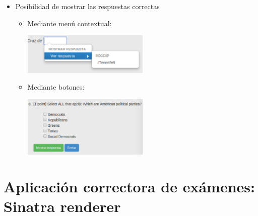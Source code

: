 \documentclass{beamer}
\begin{document}
\begin{frame}[allowframebreaks]
\begin{itemize}
    \item Posibilidad de mostrar las respuestas correctas
    \bigskip
    \begin{itemize}
      \item Mediante menú contextual:
      \newline
      \begin{center}
        \includegraphics[width=0.5\textwidth]{img/show_answer.eps}
      \end{center}
      \item Mediante botones:
      \newline
      \begin{center}
        \includegraphics[width=0.5\textwidth]{img/sm.eps}
      \end{center}  
    \end{itemize}
    
  \end{itemize}
\end{frame}
  
\section{Aplicación correctora de exámenes: Sinatra renderer}
\end{document}
